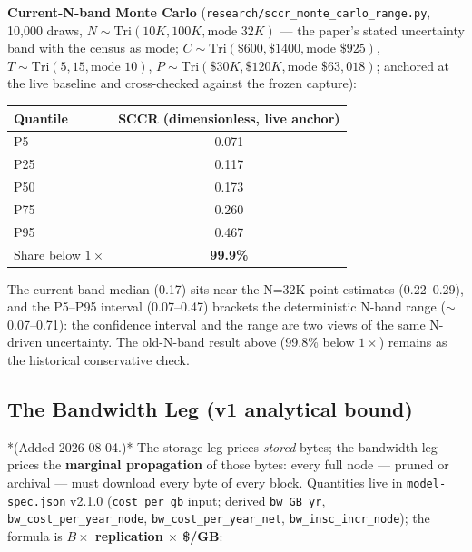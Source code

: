 \documentclass[11pt]{article}
\begin{document}
\textbf{Current-N-band Monte Carlo} (\texttt{research/sccr\_monte\_carlo\_range.py}, 10{,}000 draws, $N \sim \mathrm{Tri}(10K,100K,\text{mode }32K)$ --- the paper's stated uncertainty band with the census as mode; $C \sim \mathrm{Tri}(\$600,\$1400,\text{mode }\$925)$, $T \sim \mathrm{Tri}(5,15,\text{mode }10)$, $P \sim \mathrm{Tri}(\$30K,\$120K,\text{mode }\$63{,}018)$; anchored at the live baseline and cross-checked against the frozen capture):
\begin{center}
\begin{tabular}{lc}
\toprule
Quantile & SCCR (dimensionless, live anchor) \\
\midrule
P5 & 0.071 \\
P25 & 0.117 \\
P50 & 0.173 \\
P75 & 0.260 \\
P95 & 0.467 \\
Share below $1\times$ & \textbf{99.9\%} \\
\bottomrule
\end{tabular}
\end{center}
The current-band median (0.17) sits near the N=32K point estimates (0.22--0.29), and the P5--P95 interval (0.07--0.47) brackets the deterministic N-band range ($\sim$0.07--0.71): the confidence interval and the range are two views of the same N-driven uncertainty. The old-N-band result above (99.8\% below $1\times$) remains as the historical conservative check.

\subsection{The Bandwidth Leg (v1 analytical bound)}\label{sec:5.5}
*(Added 2026-08-04.)* The storage leg prices \emph{stored} bytes; the bandwidth leg prices the \textbf{marginal propagation} of those bytes: every full node --- pruned or archival --- must download every byte of every block. Quantities live in \texttt{model-spec.json} v2.1.0 (\texttt{cost\_per\_gb} input; derived \texttt{bw\_GB\_yr}, \texttt{bw\_cost\_per\_year\_node}, \texttt{bw\_cost\_per\_year\_net}, \texttt{bw\_insc\_incr\_node}); the formula is \textbf{$B \times$ replication $\times$ \$/GB}:
\end{document}

